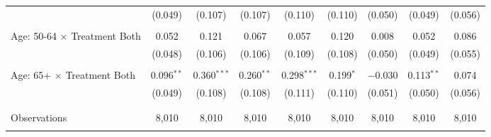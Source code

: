 \begin{tabular}{@{\extracolsep{5pt}}lcccccccc}
  & (0.049) & (0.107) & (0.107) & (0.110) & (0.110) & (0.050) & (0.049) & (0.056) \\ 
  & & & & & & & & \\ 
 Age: 50-64 $\times$ Treatment Both & 0.052 & 0.121 & 0.067 & 0.057 & 0.120 & 0.008 & 0.052 & 0.086 \\ 
  & (0.048) & (0.106) & (0.106) & (0.109) & (0.108) & (0.050) & (0.049) & (0.055) \\ 
  & & & & & & & & \\ 
 Age: 65+ $\times$ Treatment Both & 0.096$^{**}$ & 0.360$^{***}$ & 0.260$^{**}$ & 0.298$^{***}$ & 0.199$^{*}$ & $-$0.030 & 0.113$^{**}$ & 0.074 \\ 
  & (0.049) & (0.108) & (0.108) & (0.111) & (0.110) & (0.051) & (0.050) & (0.056) \\ 
  & & & & & & & & \\ 
\hline \\[-1.8ex] 

Observations & 8,010 & 8,010 & 8,010 & 8,010 & 8,010 & 8,010 & 8,010 & 8,010 \\ 
\hline 
\hline \\[-1.8ex] 
\end{tabular} 